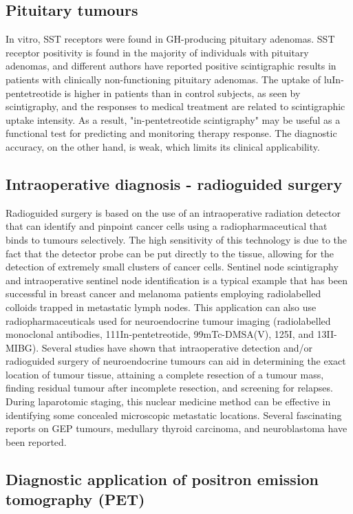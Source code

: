 \documentclass{article}
\begin{document}
\begin{multicols}{2}
\subsection{Pituitary tumours}
In vitro, SST receptors were found in GH-producing pituitary adenomas. SST receptor positivity is found in the majority of individuals with pituitary adenomas, and different authors have reported positive scintigraphic results in patients with clinically non-functioning pituitary adenomas. The uptake of luIn-pentetreotide is higher in patients than in control subjects, as seen by scintigraphy, and the responses to medical treatment are related to scintigraphic uptake intensity. As a result, "in-pentetreotide scintigraphy" may be useful as a functional test for predicting and monitoring therapy response. The diagnostic accuracy, on the other hand, is weak, which limits its clinical applicability.

\subsection{Intraoperative diagnosis - radioguided surgery}

Radioguided surgery is based on the use of an intraoperative radiation detector that can identify and pinpoint cancer cells using a radiopharmaceutical that binds to tumours selectively. The high sensitivity of this technology is due to the fact that the detector probe can be put directly to the tissue, allowing for the detection of extremely small clusters of cancer cells. Sentinel node scintigraphy and intraoperative sentinel node identification is a typical example that has been successful in breast cancer and melanoma patients employing radiolabelled colloids trapped in metastatic lymph nodes. This application can also use radiopharmaceuticals used for neuroendocrine tumour imaging (radiolabelled monoclonal antibodies, 111In-pentetreotide, 99mTc-DMSA(V), 125I, and 13II-MIBG). Several studies have shown that intraoperative detection and/or radioguided surgery of neuroendocrine tumours can aid in determining the exact location of tumour tissue, attaining a complete resection of a tumour mass, finding residual tumour after incomplete resection, and screening for relapses. During laparotomic staging, this nuclear medicine method can be effective in identifying some concealed microscopic metastatic locations. Several fascinating reports on GEP tumours, medullary thyroid carcinoma, and neuroblastoma have been reported.

\subsection{Diagnostic application of positron emission tomography (PET)}


\end{multicols}
\end{document}
